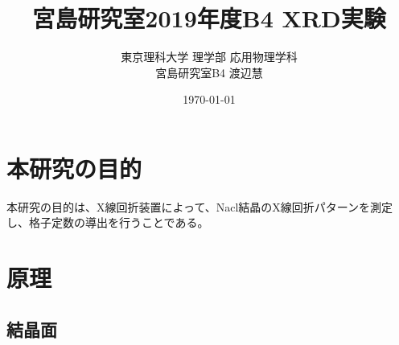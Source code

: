 \documentclass[11pt,a4j,uplatex]{jsarticle}
\title{宮島研究室2019年度B4 XRD実験}
\author{東京理科大学 理学部 応用物理学科\\宮島研究室B4 渡辺慧}
\date{\today}
\begin{document}
\maketitle %

\thispagestyle{empty}%
\clearpage
\addtocounter{page}{-1}%

\newpage

\tableofcontents %

\thispagestyle{empty}%
\clearpage
\addtocounter{page}{-1}


\newpage
\section{本研究の目的}
本研究の目的は、X線回折装置によって、Nacl結晶のX線回折パターンを測定し、格子定数の導出を行うことである。

\section{原理}

\subsection{結晶面}
\end{document}

